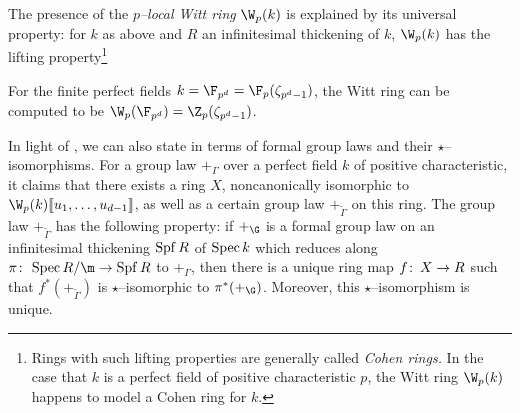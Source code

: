\begin{remark}
The presence of the \textit{$p$--local Witt ring} $\W_p(k)$ is explained by its universal property: for $k$ as above and $R$ an infinitesimal thickening of $k$, $\W_p(k)$ has the lifting property\footnote{Rings with such lifting properties are generally called \textit{Cohen rings.}  In the case that $k$ is a perfect field of positive characteristic $p$, the Witt ring $\W_p(k)$ happens to model a Cohen ring for $k$.}
\begin{center}
\end{center}
For the finite perfect fields $k = \F_{p^d} = \F_p(\zeta_{p^d-1})$, the Witt ring can be computed to be $\W_p(\F_{p^d}) = \Z_p(\zeta_{p^d-1})$.
\end{remark}

\begin{remark}\label{LubinTateModuliThmInFGLTerms}
In light of , we can also state  in terms of formal group laws and their $\star$--isomorphisms.  For a group law $+_\Gamma$ over a perfect field $k$ of positive characteristic, it claims that there exists a ring $X$, noncanonically isomorphic to $\W_p(k)\ps{u_1, \ldots, u_{d-1}}$, as well as a certain group law $+_{\widetilde \Gamma}$ on this ring.  The group law $+_{\widetilde \Gamma}$ has the following property: if $+_\G$ is a formal group law on an infinitesimal thickening $\operatorname{Spf} R$ of $\operatorname{Spec} k$ which reduces along $\pi\co \Spec R/\m \to \Spf R$ to $+_\Gamma$, then there is a unique ring map $f\colon\thinspace X \to R$ such that $f^* (+_{\widetilde \Gamma})$ is $\star$--isomorphic to $\pi^* (+_{\G})$.  Moreover, this $\star$--isomorphism is unique.
\end{remark}

